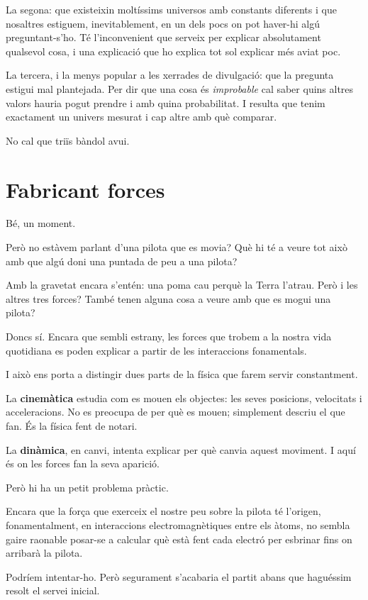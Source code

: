 La segona: que existeixin moltíssims universos amb constants diferents i que nosaltres estiguem, inevitablement, en un dels pocs on pot haver-hi algú preguntant-s'ho. Té l'inconvenient que serveix per explicar absolutament qualsevol cosa, i una explicació que ho explica tot sol explicar més aviat poc.

La tercera, i la menys popular a les xerrades de divulgació: que la pregunta estigui mal plantejada. Per dir que una cosa és \textit{improbable} cal saber quins altres valors hauria pogut prendre i amb quina probabilitat. I resulta que tenim exactament un univers mesurat i cap altre amb què comparar.

No cal que triïs bàndol avui.

\section{Fabricant forces}

Bé, un moment.

Però no estàvem parlant d'una pilota que es movia? Què hi té a veure tot això amb que algú doni una puntada de peu a una pilota?

Amb la gravetat encara s'entén: una poma cau perquè la Terra l'atrau. Però i les altres tres forces? També tenen alguna cosa a veure amb que es mogui una pilota?

Doncs sí. Encara que sembli estrany, les forces que trobem a la nostra vida quotidiana es poden explicar a partir de les interaccions fonamentals.

I això ens porta a distingir dues parts de la física que farem servir constantment.

La \textbf{cinemàtica} estudia com es mouen els objectes: les seves posicions, velocitats i acceleracions. No es preocupa de per què es mouen; simplement descriu el que fan. És la física fent de notari.

La \textbf{dinàmica}, en canvi, intenta explicar per què canvia aquest moviment. I aquí és on les forces fan la seva aparició.

Però hi ha un petit problema pràctic.

Encara que la força que exerceix el nostre peu sobre la pilota té l'origen, fonamentalment, en interaccions electromagnètiques entre els àtoms, no sembla gaire raonable posar-se a calcular què està fent cada electró per esbrinar fins on arribarà la pilota.

Podríem intentar-ho. Però segurament s'acabaria el partit abans que haguéssim resolt el servei inicial.

